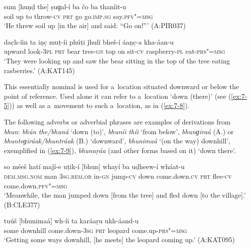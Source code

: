 \begin{exe}
\ex
\label{ex:7-6}
\gll sum [huṇḍ the] ṣuɡal-í ba čo ba  thaníit-u \\
soil up to throw-\textsc{cv} \textsc{prt} go go.\textsc{imp.sg} say.\textsc{pfv"=msg} \\
\glt `He threw soil up [in the air] and said: ``Go on!''' (A:PIR037)

\ex
\label{ex:7-7}
\gll [huṇḍɡiraá] dac̣h-íin ta iṇc̣ muṭ-íi phúṭi ǰhulí bheš-í áaṇc̣-a kha-áan-u \\
upward  look-\textsc{3pl} \textsc{prt} bear tree-\textsc{gn} top on sit-\textsc{cv} raspberry-\textsc{pl} eat-\textsc{prs"=msg} \\
\glt `They were looking up and saw the bear sitting in the top of the tree eating rasberries.' (A:KAT145)
\end{exe}

 This essentially nominal  is used for a~location situated downward or below the point of reference. Used alone it can refer to a~location `down (there)' (see (\ref{ex:7-5})) as well as a~movement to such a~location, as in (\ref{ex:7-8}).


The following adverbs or adverbial phrases are examples of derivations from \textit{bhun}: \textit{bhún the/bhuná} `down (to)', \textit{bhuníi thíi} `from below', \textit{bhunɡiraá} (A.) or \textit{bhunteɡiráak/bhuntráak} (B.) `downward', \textit{bhunimaá} `(on the way) downhill', exemplified in (\ref{ex:7-9}), \textit{bhunaṛáa} (and other  forms based on it) `down there'.

\begin{exe}
\ex
\label{ex:7-8}
\gll so méeš hatí maǰí-e uṭik-í [bhun]  whayí ba uḍheew-í wháat-u\\
\textsc{dem.msg.nom} man \textsc{3sg.rem.ob} in-\textsc{gn} jump-\textsc{cv} down
come.down.\textsc{cv} \textsc{prt} flee-\textsc{cv} come.down.\textsc{pfv"=msg} \\
\glt `Meanwhile, the man jumped down [from the tree] and fled down [to the village].' (B:CLE377)

\ex
\label{ex:7-9}
\gll tuúš [bhunimaá] wh-íi ta karáaṛu  ukh-áand-u \\
some downhill  come.down-\textsc{3sg} \textsc{prt} leopard come.up-\textsc{prs"=msg} \\
\glt `Getting some ways downhill, [he meets] the leopard coming up.' (A:KAT095)
\end{exe}

